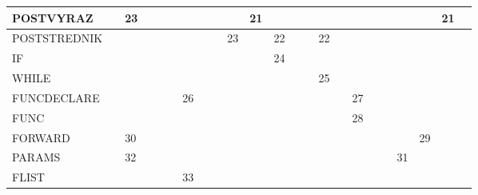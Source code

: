 \documentclass[a4paper]{article}
\begin{document}
\begin{landscape}
\begin{table}[h]
\begin{tabular}{|l|l|l|l|l|l|l|l|l|l|l|l|l|l|l|l|l|l|l|l|l|l|l|}
POSTVYRAZ    &     & 23 &   &     &   &       &      &    &      & 21  &    &      &      &       &    &          &      &   &    &         & 21   &  \\ \hline
POSTSTREDNIK &     &    &   &     &   &       &      &    & 23   &     & 22 &      &      & 22    &    &          &      &   &    &         &      &  \\ \hline
IF           &     &    &   &     &   &       &      &    &      &     & 24 &      &      &       &    &          &      &   &    &         &      &  \\ \hline
WHILE        &     &    &   &     &   &       &      &    &      &     &    &      &      & 25    &    &          &      &   &    &         &      &  \\ \hline
FUNCDECLARE  &     &    &   &     &   & 26    &      &    &      &     &    &      &      &       &    & 27       &      &   &    &         &      &  \\ \hline
FUNC         &     &    &   &     &   &       &      &    &      &     &    &      &      &       &    & 28       &      &   &    &         &      &  \\ \hline
FORWARD      &     & 30 &   &     &   &       &      &    &      &     &    &      &      &       &    &          &      &   &    & 29      &      &  \\ \hline
PARAMS       &     & 32 &   &     &   &       &      &    &      &     &    &      &      &       &    &          &      &   & 31 &         &      &  \\ \hline
FLIST        &     &    &   &     &   & 33    &      &    &      &     &    &      &      &       &    &          &      &   &    &         &      &  \\ \hline
\end{tabular}
\end{table}
\end{landscape}
\end{document}
